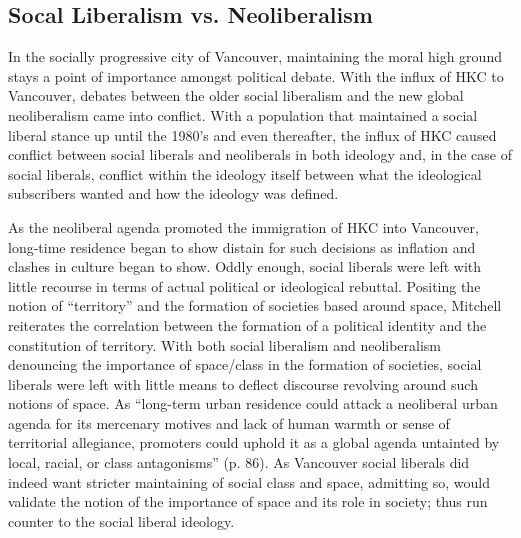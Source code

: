 \documentclass[man,donotrepeattitle,letter]{apa6}
\begin{document}
\subsection{Socal Liberalism vs. Neoliberalism}
In the socially progressive city of Vancouver, maintaining the moral high ground stays a point of importance amongst political debate. With the influx of HKC to Vancouver, debates between the older social liberalism and the new global neoliberalism came into conflict. With a population that maintained a social liberal stance up until the 1980's and even thereafter, the influx of HKC caused conflict between social liberals and neoliberals in both ideology and, in the case of social liberals, conflict within the ideology itself between what the ideological subscribers wanted and how the ideology was defined.

As the neoliberal agenda promoted the immigration of HKC into Vancouver, long-time residence began to show distain for such decisions as inflation and clashes in culture began to show.  Oddly enough, social liberals were left with little recourse in terms of actual political or ideological rebuttal. Positing the notion of ``territory'' and the formation of societies based around space, Mitchell reiterates the correlation between the formation of a political identity and the constitution of territory.  With both social liberalism and neoliberalism denouncing the importance of space/class in the formation of societies, social liberals were left with little means to deflect discourse revolving around such notions of space.  As ``long-term urban residence could attack a neoliberal urban agenda for its mercenary motives and lack of human warmth or sense of territorial allegiance, promoters could uphold it as a global agenda untainted by local, racial, or class antagonisms'' (p. 86).  As Vancouver social liberals did indeed want stricter maintaining of social class and space, admitting so, would validate the notion of the importance of space and its role in society; thus run counter to the social liberal ideology.
\end{document}
